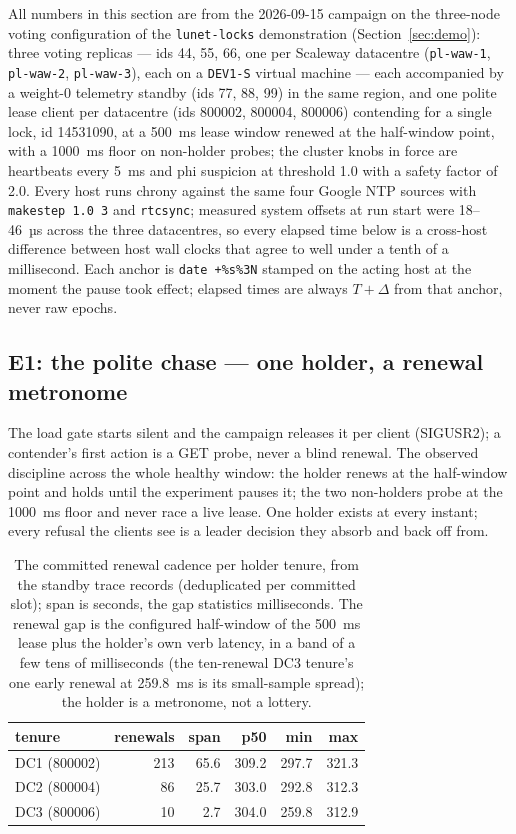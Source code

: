 \documentclass[10pt,journal,letterpaper]{IEEEtran}
\newcommand{\code}[1]{\texttt{\small #1}}
\begin{document}
All numbers in this section are from the 2026-09-15 campaign on the
three-node voting configuration of the \code{lunet-locks} demonstration
(Section~\ref{sec:demo}): three voting replicas --- ids 44, 55, 66, one
per Scaleway datacentre (\code{pl-waw-1}, \code{pl-waw-2},
\code{pl-waw-3}), each on a \code{DEV1-S} virtual machine --- each
accompanied by a weight-0 telemetry standby (ids 77, 88, 99) in the
same region, and one polite lease client per datacentre (ids 800002,
800004, 800006) contending for a single lock, id 14531090, at a 500~ms
lease window renewed at the half-window point, with a 1000~ms floor on
non-holder probes; the cluster knobs in force are heartbeats every 5~ms
and phi suspicion at threshold 1.0 with a safety factor of 2.0. Every
host runs chrony against the same four Google
NTP sources with \code{makestep 1.0 3} and \code{rtcsync}; measured
system offsets at run start were 18--46~µs across the three
datacentres, so every elapsed time below is a cross-host difference
between host wall clocks that agree to well under a tenth of a
millisecond. Each anchor is \code{date +\%s\%3N} stamped on the acting
host at the moment the pause took effect; elapsed times are always
$T+\Delta$ from that anchor, never raw epochs.

\subsection{E1: the polite chase --- one holder, a renewal metronome}

The load gate starts silent and the campaign releases it per client
(SIGUSR2); a contender's first action is a GET probe, never a blind
renewal. The observed discipline across the whole healthy window: the
holder renews at the half-window point and holds until the experiment
pauses it; the two non-holders probe at the 1000~ms floor and never
race a live lease. One holder exists at every instant; every refusal
the clients see is a leader decision they absorb and back off from.

\begin{table}[t]
\centering
\small
\begin{tabular}{lrrrrr}
\toprule
tenure & renewals & span & p50 & min & max \\
\midrule
DC1 (800002) & 213 & 65.6 & 309.2 & 297.7 & 321.3 \\
DC2 (800004) & 86 & 25.7 & 303.0 & 292.8 & 312.3 \\
DC3 (800006) & 10 & 2.7 & 304.0 & 259.8 & 312.9 \\
\bottomrule
\end{tabular}
\caption{The committed renewal cadence per holder tenure, from the
standby trace records (deduplicated per committed slot); span is
seconds, the gap statistics milliseconds. The renewal gap
is the configured half-window of the 500~ms lease plus the holder's own
verb latency, in a band of a few tens of milliseconds (the ten-renewal
DC3 tenure's one early renewal at 259.8~ms is its small-sample spread);
the holder is a metronome, not a lottery.}
\label{tab:renewal}
\end{table}
\end{document}
